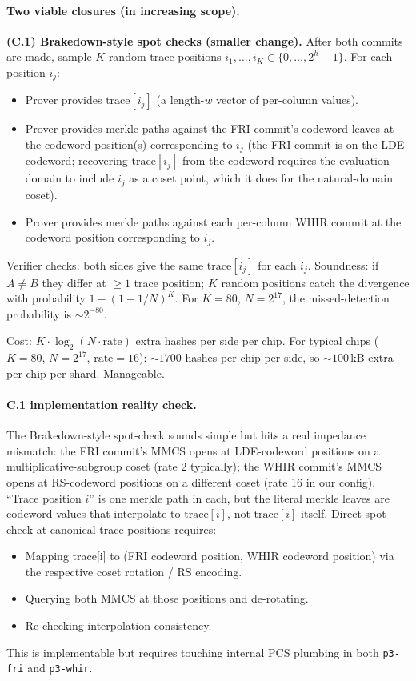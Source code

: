 \paragraph{Two viable closures (in increasing scope).}

\textbf{(C.1) Brakedown-style spot checks (smaller change).}
After both commits are made, sample $K$ random trace positions
$i_1, \ldots, i_K \in \{0, \ldots, 2^h - 1\}$.  For each position
$i_j$:
\begin{itemize}
  \item Prover provides $\mathrm{trace}[i_j]$ (a length-$w$ vector
        of per-column values).
  \item Prover provides merkle paths against the FRI commit's
        codeword leaves at the codeword position(s) corresponding to
        $i_j$ (the FRI commit is on the LDE codeword; recovering
        $\mathrm{trace}[i_j]$ from the codeword requires the
        evaluation domain to include $i_j$ as a coset point, which
        it does for the natural-domain coset).
  \item Prover provides merkle paths against each per-column WHIR
        commit at the codeword position corresponding to $i_j$.
\end{itemize}
Verifier checks: both sides give the same $\mathrm{trace}[i_j]$ for
each $i_j$.  Soundness: if $A \neq B$ they differ at $\geq 1$ trace
position; $K$ random positions catch the divergence with probability
$1 - (1 - 1/N)^K$.  For $K = 80$, $N = 2^{17}$, the missed-detection
probability is $\sim 2^{-80}$.

Cost: $K \cdot \log_2(N \cdot \text{rate})$ extra hashes per side
per chip.  For typical chips (\(K = 80\), \(N = 2^{17}\),
\(\text{rate} = 16\)): $\sim 1700$ hashes per chip per side, so
$\sim 100\,$kB extra per chip per shard.  Manageable.

\paragraph{C.1 implementation reality check.}
The Brakedown-style spot-check sounds simple but hits a real impedance
mismatch: the FRI commit's MMCS opens at LDE-codeword positions on a
multiplicative-subgroup coset (rate 2 typically); the WHIR commit's
MMCS opens at RS-codeword positions on a different coset (rate 16
in our config).  ``Trace position $i$'' is one merkle path in each,
but the literal merkle leaves are codeword values that interpolate
to $\mathrm{trace}[i]$, not $\mathrm{trace}[i]$ itself.  Direct
spot-check at canonical trace positions requires:
\begin{itemize}
  \item Mapping trace[i] to (FRI codeword position, WHIR codeword
        position) via the respective coset rotation / RS encoding.
  \item Querying both MMCS at those positions and de-rotating.
  \item Re-checking interpolation consistency.
\end{itemize}
This is implementable but requires touching internal PCS plumbing in
both \texttt{p3-fri} and \texttt{p3-whir}.

